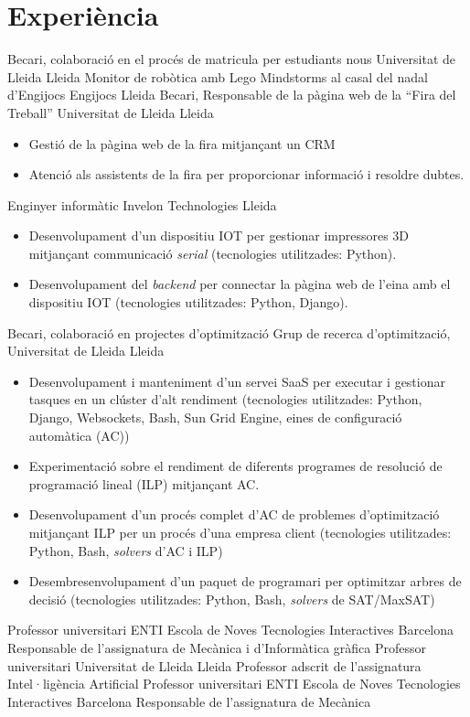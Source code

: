 \documentclass[a4paper,12pt,final]{moderncv}
\begin{document}
\section{Experiència}
	{Becari, colaboració en el procés de matricula per estudiants nous}
	{Universitat de Lleida}
	{Lleida}
	{}
	{}
	{Monitor de robòtica amb Lego Mindstorms al casal del nadal d'Engijocs}
	{Engijocs}
	{Lleida}
	{}
	{}
	{Becari, Responsable de la pàgina web de la ``Fira del Treball''}
	{Universitat de Lleida}
	{Lleida}
	{}
	{\begin{itemize}
		\item Gestió de la pàgina web de la fira mitjançant un CRM
		\item Atenció als assistents de la fira per proporcionar informació i resoldre dubtes.
	\end{itemize}}
	{Enginyer informàtic}
	{Invelon Technologies}
	{Lleida}
	{}
	{\begin{itemize}
		\item Desenvolupament d'un dispositiu IOT per gestionar impressores 3D
			mitjançant communicació \textit{serial} (tecnologies utilitzades: Python).
		\item Desenvolupament del \textit{backend} per connectar la pàgina web
			de l'eina amb el dispositiu IOT (tecnologies utilitzades: Python, Django).
	\end{itemize}}
	{Becari, colaboració en projectes d'optimització}
	{Grup de recerca d'optimització, Universitat de Lleida}
	{Lleida}
	{}
	{\begin{itemize}
		\item Desenvolupament i manteniment d'un servei SaaS per executar i
			gestionar tasques en un clúster d'alt rendiment (tecnologies
			utilitzades: Python, Django, Websockets, Bash, Sun Grid Engine,
			eines de configuració automàtica (AC))
		\item Experimentació sobre el rendiment de diferents programes de
			resolució de programació lineal (ILP) mitjançant AC.
		\item Desenvolupament d'un procés complet d'AC de problemes
			d'optimització mitjançant ILP per un procés d'una empresa client
			(tecnologies utilitzades: Python, Bash, \textit{solvers} d'AC i 
			ILP)
		\item Desembresenvolupament d'un paquet de programari per optimitzar
			arbres de decisió (tecnologies utilitzades: Python, Bash,
			\textit{solvers} de SAT/MaxSAT)
	\end{itemize}}
	{Professor universitari}
	{ENTI Escola de Noves Tecnologies Interactives}
	{Barcelona}
	{}
	{Responsable de l'assignatura de Mecànica i d'Informàtica gràfica}
	{Professor universitari}
	{Universitat de Lleida}
	{Lleida}
	{}
	{Professor adscrit de l'assignatura Intel·ligència Artificial}
	{Professor universitari}
	{ENTI Escola de Noves Tecnologies Interactives}
	{Barcelona}
	{}
	{Responsable de l'assignatura de Mecànica}
\end{document}
